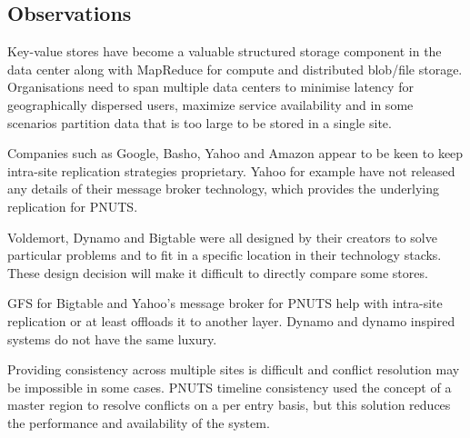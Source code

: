 \subsection{Observations}
Key-value stores have become a valuable structured storage component in the data center along with MapReduce for compute and distributed blob/file storage. Organisations need to span multiple data centers to minimise latency for geographically dispersed users, maximize service availability and in some scenarios partition data that is too large to be stored in a single site.

Companies such as Google, Basho, Yahoo and Amazon appear to be keen to keep intra-site replication strategies proprietary. Yahoo for example have not released any details of their message broker technology, which provides the underlying replication for PNUTS.

Voldemort, Dynamo and Bigtable were all designed by their creators to solve particular problems and to fit in a specific location in their technology stacks. These design decision will make it difficult to directly compare some stores.

GFS for Bigtable and Yahoo's message broker for PNUTS help with intra-site replication or at least offloads it to another layer. Dynamo and dynamo inspired systems do not have the same luxury.

Providing consistency across multiple sites is difficult and conflict resolution may be impossible in some cases. PNUTS timeline consistency used the concept of a master region to resolve conflicts on a per entry basis, but this solution reduces the performance and availability of the system. 
